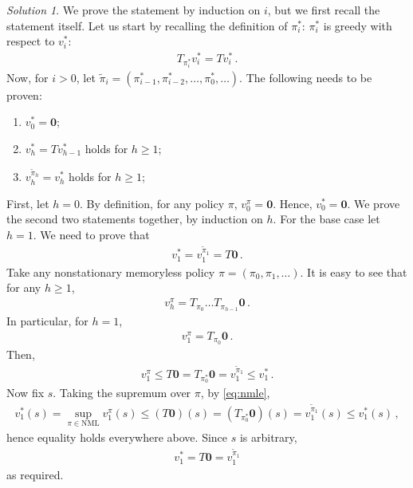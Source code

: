\documentclass{article}
\DeclareMathOperator*{\1}{\mathbbm{1}}
\newcommand{\0}{\mathbf{0}}
\theoremstyle{definition}
\theoremstyle{remark}
\newtheorem*{solution*}{Solution}
\theoremstyle{theorem}
\begin{document}
\begin{solution*}
We prove the statement by induction on $i$, but we first recall the statement itself.
Let us start by recalling the definition of $\pi_i^*$: $\pi_i^*$ is greedy with respect to $v_i^*$:
\begin{align*}
T_{\pi^*_i} v_i^* = T v_i^*\,.
\end{align*}
Now, for $i>0$, let $\tilde\pi_i =(\pi_{i-1}^*,\pi_{i-2}^*,\dots,\pi_0^*,\dots)$.
The following needs to be proven:
\begin{enumerate}
\item $v_0^* = \boldsymbol{0}$;
\item $v_{h}^* = T v_{h-1}^*$ holds for $h\ge 1$;
\item $v^{\tilde\pi_h}_h = v_h^*$ holds for $h\ge 1$;
\end{enumerate}
First, let $h=0$. By definition, for any policy $\pi$, $v_0^\pi = \boldsymbol{0}$. Hence, $v^*_0 = \boldsymbol{0}$.
We prove the second two statements together, by induction on $h$. For the base case let $h=1$.
We need to prove that
\begin{align*}
v_1^* = v_1^{\tilde\pi_1} = T \boldsymbol{0}\,.
\end{align*}
Take any nonstationary memoryless policy $\pi = (\pi_0,\pi_1,\dots)$.
It is easy to see that for any $h\ge 1$,
\begin{align}
v_h^\pi = T_{\pi_0} \dots T_{\pi_{h-1}} \boldsymbol{0}\,. \label{eq:fhpe}
\end{align}
In particular, for $h=1$,
\begin{align*}
v_1^\pi = T_{\pi_0} \boldsymbol{0}\,.
\end{align*}
Then,
\begin{align*}
v_1^\pi \le T \boldsymbol{0} = T_{\pi_0^*} \boldsymbol{0} = v_1^{\tilde\pi_1} \le v_1^*\,.
\end{align*}
Now fix $s$.
Taking the supremum over $\pi$, by \cref{eq:nmle},
\begin{align*}
v_1^*(s) 
= \sup_{\pi\in \text{NML}} v_1^\pi(s) 
\le (T \boldsymbol{0})(s) 
= (T_{\pi_0^*} \boldsymbol{0})(s) 
= v_1^{\tilde\pi_1}(s)\le v^*_1(s)\,,
\end{align*}
hence equality holds everywhere above. 
Since $s$ is arbitrary,
\begin{align*}
v_1^* = T \boldsymbol{0} = v_1^{\tilde\pi_1}
\end{align*}
as required.


\end{solution*}
\end{document}
